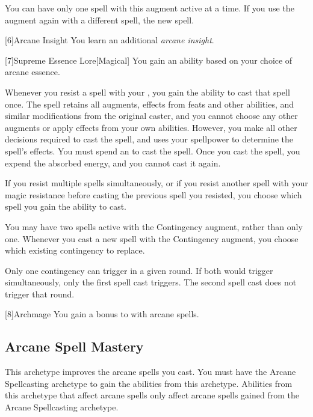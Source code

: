        You can have only one spell with this augment active at a time.
        If you use the augment again with a different spell, the new spell.

        [6]{Arcane Insight}
        You learn an additional \textit{arcane insight}.

        [7]{Supreme Essence Lore}[Magical]
        You gain an ability based on your choice of arcane essence.

         Whenever you resist a spell with your , you gain the ability to cast that spell once.
        The spell retains all augments, effects from feats and other abilities, and similar modifications from the original caster, and you cannot choose any other augments or apply effects from your own abilities.
        However, you make all other decisions required to cast the spell, and uses your spellpower to determine the spell's effects.
        You must spend an  to cast the spell.
        Once you cast the spell, you expend the absorbed energy, and you cannot cast it again.

        If you resist multiple spells simultaneously, or if you resist another spell with your magic resistance before casting the previous spell you resisted, you choose which spell you gain the ability to cast.

         You may have two spells active with the Contingency augment, rather than only one.
        Whenever you cast a new spell with the Contingency augment, you choose which existing contingency to replace.

        Only one contingency can trigger in a given round.
        If both would trigger simultaneously, only the first spell cast triggers.
        The second spell cast does not trigger that round.

        [8]{Archmage}
        You gain a  bonus to  with arcane spells.

    \subsection{Arcane Spell Mastery}
        This archetype improves the arcane spells you cast.
        You must have the Arcane Spellcasting archetype to gain the abilities from this archetype.
        Abilities from this archetype that affect arcane spells only affect arcane spells gained from the Arcane Spellcasting archetype.

